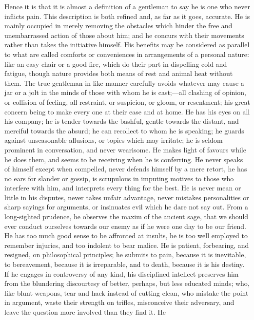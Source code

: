 Hence it is that it is almost a definition of a gentleman to say he
is one who never inflicts pain. This description is both refined and,
as far as it goes, accurate. He is mainly occupied in merely removing
the obstacles which hinder the free and unembarrassed action of
those about him; and he concurs with their movements rather than takes
the initiative himself. His benefits may be considered as parallel to
what are called comforts or conveniences in arrangements of a personal
nature: like an easy chair or a good fire, which do their part in
dispelling cold and fatigue, though nature provides both means of rest
and animal heat without them. The true gentleman in like manner
carefully avoids whatever may cause a jar or a jolt in the minds of
those with whom he is cast;—all clashing of opinion, or collision of
feeling, all restraint, or suspicion, or gloom, or resentment; his
great concern being to make every one at their ease and at home. He
has his eyes on all his company; he is tender towards the bashful,
gentle towards the distant, and merciful towards the absurd; he can
recollect to whom he is speaking; he guards against unseasonable
allusions, or topics which may irritate; he is seldom prominent in
conversation, and never wearisome. He makes light of favours while he
does them, and seems to be receiving when he is conferring. He never
speaks of himself except when compelled, never defends himself by a
mere retort, he has no ears for slander or gossip, is scrupulous in
imputing motives to those who interfere with him, and interprets every
thing for the best. He is never mean or little in his disputes, never
takes unfair advantage, never mistakes personalities or sharp sayings
for arguments, or insinuates evil which he dare not say out. From a
long-sighted prudence, he observes the maxim of the ancient sage, that
we should ever conduct ourselves towards our enemy as if he were one
day to be our friend. He has too much good sense to be affronted at
insults, he is too well employed to remember injuries, and too
indolent to bear malice. He is patient, forbearing, and
resigned, on philosophical principles; he submits to pain, because it
is inevitable, to bereavement, because it is irreparable, and to
death, because it is his destiny. If he engages in controversy of any
kind, his disciplined intellect preserves him from the blundering
discourtesy of better, perhaps, but less educated minds; who, like
blunt weapons, tear and hack instead of cutting clean, who mistake the
point in argument, waste their strength on trifles, misconceive their
adversary, and leave the question more involved than they find it. He
